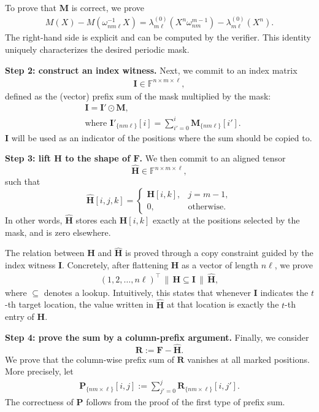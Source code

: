 To prove that $\mathbf{M}$ is correct, we prove
\begin{align}
    M(X)-M(\omega_{nm\ell}^{-1}X)
    =
    \lambda_{m\ell}^{(0)}(X^n\omega_{nm}^{m-1})-\lambda_{m\ell}^{(0)}(X^n).
\end{align}
The right-hand side is explicit and can be
computed by the verifier. This identity uniquely characterizes the desired
periodic mask.

\smallskip
\noindent
\textbf{Step 2: construct an index witness.}
Next, we commit to an index matrix
\begin{align}
    \mathbf{I}\in\mathbb{F}^{n\times m\times \ell},
\end{align}
defined as the (vector) prefix sum of the mask multiplied by the mask:
\begin{align}
  &\mathbf{I} = \mathbf{I}'\odot \mathbf{M},\\
  &\text{where } \mathbf{I}'_{\{nm\ell\}}[i] = \sum_{i'=0}^{i}\mathbf{M}_{\{nm\ell\}}[i'].
\end{align}
$\mathbf{I}$ will be used as an indicator of the positions 
where the sum should be copied to.

\smallskip
\noindent
\textbf{Step 3: lift $\mathbf{H}$ to the shape of $\mathbf{F}$.}
We then commit to an aligned tensor
\[
    \widehat{\mathbf{H}}\in\mathbb{F}^{n\times m\times \ell},
\]
such that
\[
    \widehat{\mathbf{H}}[i,j,k]
    =
    \begin{cases}
        \mathbf{H}[i,k], & j=m-1,\\
        0, & \text{otherwise}.
    \end{cases}
\]
In other words, $\widehat{\mathbf{H}}$ stores each $\mathbf{H}[i,k]$ exactly at the
positions selected by the mask, and is zero elsewhere.

The relation between $\mathbf{H}$ and $\widehat{\mathbf{H}}$ is proved through a copy
constraint guided by the index witness $\mathbf{I}$. Concretely, after
flattening $\mathbf{H}$ as a vector of length $n\ell$, we prove
\begin{align}
    (1,2,\dots,n\ell)^\top \,\|\, \mathbf{H}
    \subseteq
    \mathbf{I} \,\|\, \widehat{\mathbf{H}},\label{eq:copy-constraint-H-Hhat}
\end{align}
where $\subseteq$ denotes a lookup. Intuitively, this states that whenever
$\mathbf{I}$ indicates the $t$-th target location, the value written in
$\widehat{\mathbf{H}}$ at that location is exactly the $t$-th entry of $\mathbf{H}$.

\smallskip
\noindent
\textbf{Step 4: prove the sum by a column-prefix argument.}
Finally, we consider
\[
    \mathbf{R}:=\mathbf{F}-\widehat{\mathbf{H}}.
\]
We prove that the column-wise prefix sum of $\mathbf{R}$ vanishes at all marked
positions. More precisely, let
\begin{align}
    \mathbf{P}_{\{nm\times \ell\}}[i, j]
    :=
    \sum_{j'=0}^{j}\mathbf{R}_{\{nm\times \ell\}}[i, j'].\label{eq:column-prefix-vanishes-at-mask}
\end{align}
The correctness of $\mathbf{P}$ follows from the proof of the first type of prefix sum.

